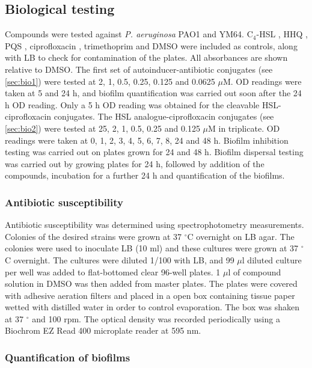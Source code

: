 \subsection{Biological testing}

Compounds were tested against \textit{P. aeruginosa} PAO1\cite{Stover2000} and YM64\cite{Morita2001}.
C$_4$-HSL , HHQ , PQS , ciprofloxacin , trimethoprim  and DMSO were included as controls, along with LB to check for contamination of the plates. All absorbances are shown relative to DMSO.
The first set of autoinducer-antibiotic conjugates (see \ref{sec:bio1}) were tested at 2, 1, 0.5, 0.25, 0.125 and 0.0625 $\mu$M. OD readings were taken at 5 and 24 h, and biofilm quantification was carried out soon after the 24 h OD reading. Only a 5 h OD reading was obtained for the cleavable HSL-ciprofloxacin conjugates.
The HSL analogue-ciprofloxacin conjugates (see \ref{sec:bio2}) were tested at 25, 2, 1, 0.5, 0.25 and 0.125 $\mu$M in triplicate. OD readings were taken at 0, 1, 2, 3, 4, 5, 6, 7, 8, 24 and 48 h. Biofilm inhibition testing was carried out on plates grown for 24 and 48 h. Biofilm dispersal testing was carried out by growing plates for 24 h, followed by addition of the compounds, incubation for a further 24 h and quantification of the biofilms.

\subsubsection{Antibiotic susceptibility\label{sec:ABsus}}

Antibiotic susceptibility was determined using spectrophotometry measurements.
Colonies of the desired strains were grown at 37 $^{\circ}$C overnight on LB agar.
The colonies were used to inoculate LB (10 ml) and these cultures were grown at 37 $^{\circ}$C overnight. 
The cultures were diluted 1/100 with LB, and 99 $\mu$l diluted culture per well was added to flat-bottomed clear 96-well plates. 1 $\mu$l of compound solution in DMSO was then added from master plates.
The plates were covered with adhesive aeration filters and placed in a open box containing tissue paper wetted with distilled water in order to control evaporation. The box was shaken at 37 $^{\circ}$ and 100 rpm.
The optical density was recorded periodically using a Biochrom EZ Read 400 microplate reader at 595 nm.

\subsubsection{Quantification of biofilms\label{sec:biofilm_quant}}

